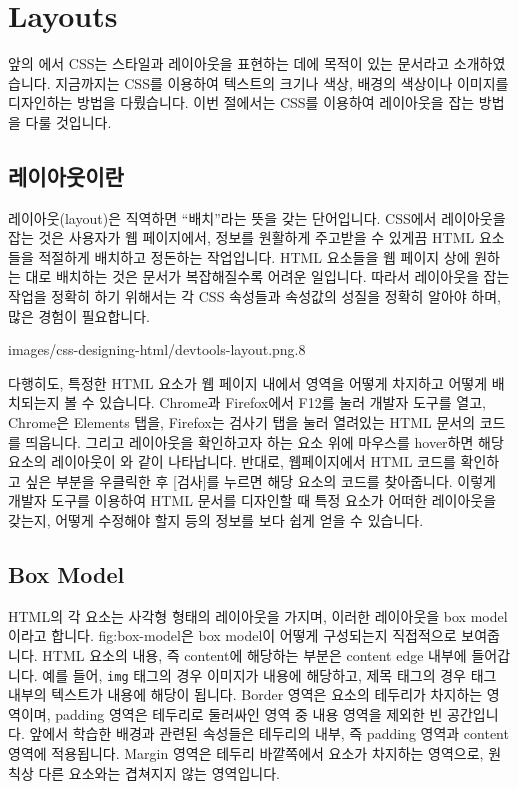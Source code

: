 \section{Layouts} \label{sect:layouts}

앞의 에서 CSS는 스타일과 레이아웃을 표현하는 데에 목적이 있는 문서라고 소개하였습니다. 지금까지는 CSS를 이용하여 텍스트의 크기나 색상, 배경의 색상이나 이미지를 디자인하는 방법을 다뤘습니다. 이번 절에서는 CSS를 이용하여 레이아웃을 잡는 방법을 다룰 것입니다. 

\subsection*{레이아웃이란}
레이아웃(layout)은 직역하면 ``배치''라는 뜻을 갖는 단어입니다. CSS에서 레이아웃을 잡는 것은 사용자가 웹 페이지에서, 정보를 원활하게 주고받을 수 있게끔 HTML 요소들을 적절하게 배치하고 정돈하는 작업입니다. HTML 요소들을 웹 페이지 상에 원하는 대로 배치하는 것은 문서가 복잡해질수록 어려운 일입니다. 따라서 레이아웃을 잡는 작업을 정확히 하기 위해서는 각 CSS 속성들과 속성값의 성질을 정확히 알아야 하며, 많은 경험이 필요합니다. 

    {images/css-designing-html/devtools-layout.png}{.8}

다행히도, 특정한 HTML 요소가 웹 페이지 내에서 영역을 어떻게 차지하고 어떻게 배치되는지 볼 수 있습니다. Chrome과 Firefox에서 F12를 눌러 개발자 도구를 열고, Chrome은 Elements 탭을, Firefox는 검사기 탭을 눌러 열려있는 HTML 문서의 코드를 띄웁니다. 그리고 레이아웃을 확인하고자 하는 요소 위에 마우스를 hover하면 해당 요소의 레이아웃이 와 같이 나타납니다. 반대로, 웹페이지에서 HTML 코드를 확인하고 싶은 부분을 우클릭한 후 [검사]를 누르면 해당 요소의 코드를 찾아줍니다. 이렇게 개발자 도구를 이용하여 HTML 문서를 디자인할 때 특정 요소가 어떠한 레이아웃을 갖는지, 어떻게 수정해야 할지 등의 정보를 보다 쉽게 얻을 수 있습니다. 

\subsection*{Box Model}
HTML의 각 요소는 사각형 형태의 레이아웃을 가지며, 이러한 레이아웃을 box model이라고 합니다. {fig:box-model}은 box model이 어떻게 구성되는지 직접적으로 보여줍니다. HTML 요소의 내용, 즉 content에 해당하는 부분은 content edge 내부에 들어갑니다. 예를 들어, \verb|img| 태그의 경우 이미지가 내용에 해당하고, 제목 태그의 경우 태그 내부의 텍스트가 내용에 해당이 됩니다. Border 영역은 요소의 테두리가 차지하는 영역이며, padding 영역은 테두리로 둘러싸인 영역 중 내용 영역을 제외한 빈 공간입니다. 앞에서 학습한 배경과 관련된 속성들은 테두리의 내부, 즉 padding 영역과 content 영역에 적용됩니다. Margin 영역은 테두리 바깥쪽에서 요소가 차지하는 영역으로, 원칙상 다른 요소와는 겹쳐지지 않는 영역입니다.

